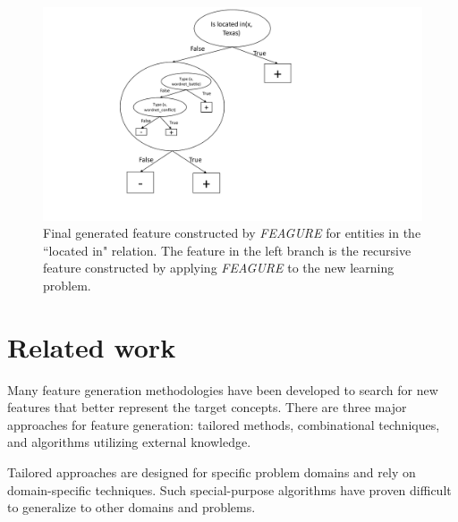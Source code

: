 \documentclass[letterpaper]{article} %
\theoremstyle{definition}
\begin{document}
\begin{figure}[!h]
	\centering
	\includegraphics[width=\linewidth]{figure_rec3_feature_new}
	\caption{Final generated feature constructed by \emph{FEAGURE} for entities in the ``located in" relation. The feature in the left branch is the recursive feature constructed by applying \emph{FEAGURE} to the new learning problem.}
	\label{fig:figure_rec3_feature_full}
\end{figure}

\section{Related work}

Many feature generation methodologies have been developed to search for new features that better represent the target concepts. There are three major approaches for feature generation: tailored methods, combinational techniques, and algorithms utilizing external knowledge.

Tailored approaches \cite{sutton1991learning,hirsh1994bootstrapping} are designed for specific problem domains and rely on domain-specific techniques. %
Such special-purpose algorithms %
have proven difficult to generalize to other domains and problems.
\end{document}
